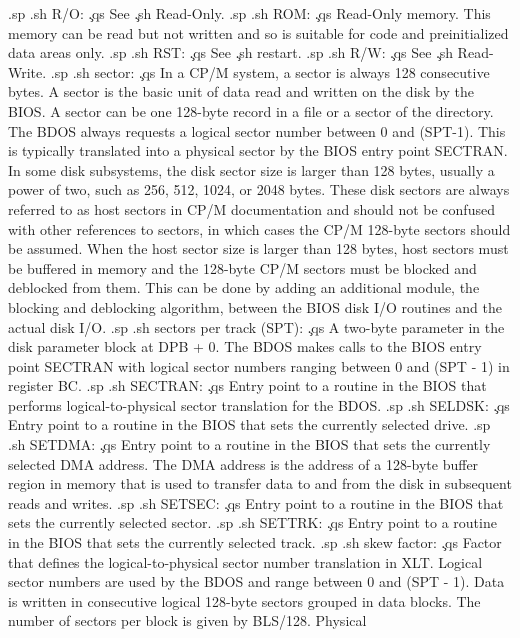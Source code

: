 .sp
.sh
R/O:  \c
.qs
See \c
.sh
Read-Only.
.sp
.sh
ROM:  \c
.qs
Read-Only memory.  This memory can be read but not written and so 
is suitable for code and preinitialized data areas only.
.sp
.sh
RST:  \c
.qs
See \c
.sh
restart.
.sp
.sh
R/W:  \c
.qs
See \c
.sh
Read-Write.
.sp
.sh
sector:  \c
.qs
In a CP/M system, a sector is always 128 consecutive bytes.  A 
sector is the basic unit of data read and written on the disk by 
the BIOS.  A sector can be one 128-byte record in a file or a 
sector of the directory.  The BDOS always requests a logical 
sector number between 0 and (SPT-1).  This is typically 
translated into a physical sector by the BIOS entry point 
SECTRAN.  In some disk subsystems, the disk sector size is larger 
than 128 bytes, usually a power of two, such as 256, 512, 1024, or 
2048 bytes.  These disk sectors are always referred to as host 
sectors in CP/M documentation and should not be confused with 
other references to sectors, in which cases the CP/M 128-byte 
sectors should be assumed.  When the host sector size is larger 
than 128 bytes, host sectors must be buffered in memory and the 
128-byte CP/M sectors must be blocked and deblocked from them.  
This can be done by adding an additional module, the blocking and 
deblocking algorithm, between the BIOS disk I/O routines and the 
actual disk I/O.
.sp
.sh
sectors per track (SPT):  \c
.qs
A two-byte parameter in the disk parameter block at DPB + 0.  The 
BDOS makes calls to the BIOS entry point SECTRAN with logical 
sector numbers ranging between 0 and (SPT - 1) in register BC.
.sp
.sh
SECTRAN:  \c
.qs
Entry point to a routine in the BIOS that performs 
logical-to-physical sector translation for the BDOS.
.sp
.sh
SELDSK:  \c
.qs
Entry point to a routine in the BIOS that sets the currently 
selected drive.
.sp
.sh
SETDMA:  \c
.qs
Entry point to a routine in the BIOS that sets the currently 
selected DMA address.  The DMA address is the address of a 
128-byte buffer region in memory that is used to transfer data to 
and from the disk in subsequent reads and writes.
.sp
.sh
SETSEC:  \c
.qs
Entry point to a routine in the BIOS that sets the currently 
selected sector.
.sp
.sh
SETTRK:  \c
.qs
Entry point to a routine in the BIOS that sets the currently 
selected track.
.sp
.sh
skew factor:  \c
.qs
Factor that defines the logical-to-physical sector number 
translation in XLT.  Logical sector numbers are used by the BDOS 
and range between 0 and (SPT - 1).  Data is written in 
consecutive logical 128-byte sectors grouped in data blocks.  The 
number of sectors per block is given by BLS/128.  Physical 
